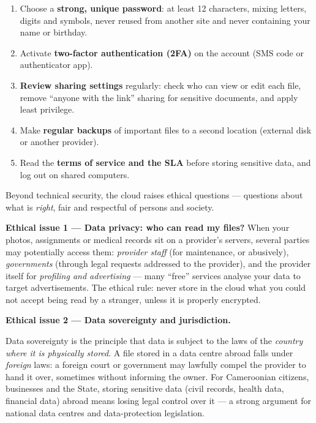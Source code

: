 \documentclass[11pt]{article}
\newcommand{\cle}[1]{{\popxbold\color{popdark}#1}}
\newcounter{popsec}
\newcounter{popsub}
\newcommand{\courssub}[1]{%
  \stepcounter{popsub}%
  \par\vspace{9pt}\noindent{\popxbold\fontsize{11.5}{13}\selectfont\color{popink}{\color{poporange}\thepopsec.\thepopsub}\hspace{6pt}#1}\par\nopagebreak\vspace{4pt}
}
\begin{document}
\begin{methode}
\begin{enumerate}
\item Choose a \textbf{strong, unique password}: at least 12 characters, mixing letters, digits and symbols, never reused from another site and never containing your name or birthday.
\item Activate \textbf{two-factor authentication (2FA)} on the account (SMS code or authenticator app).
\item \textbf{Review sharing settings} regularly: check who can view or edit each file, remove ``anyone with the link'' sharing for sensitive documents, and apply least privilege.
\item Make \textbf{regular backups} of important files to a second location (external disk or another provider).
\item Read the \textbf{terms of service and the SLA} before storing sensitive data, and log out on shared computers.
\end{enumerate}
\end{methode}

\courssub{Cloud Ethics}

Beyond technical security, the cloud raises \cle{ethical} questions — questions about what is \emph{right}, fair and respectful of persons and society.

\textbf{Ethical issue 1 — Data privacy: who can read my files?} When your photos, assignments or medical records sit on a provider's servers, several parties may potentially access them: \emph{provider staff} (for maintenance, or abusively), \emph{governments} (through legal requests addressed to the provider), and the provider itself for \emph{profiling and advertising} — many ``free'' services analyse your data to target advertisements. The ethical rule: never store in the cloud what you could not accept being read by a stranger, unless it is properly encrypted.

\textbf{Ethical issue 2 — Data sovereignty and jurisdiction.}

\begin{definition}
\cle{Data sovereignty} is the principle that data is subject to the laws of the \emph{country where it is physically stored}. A file stored in a data centre abroad falls under \emph{foreign} laws: a foreign court or government may lawfully compel the provider to hand it over, sometimes without informing the owner. For Cameroonian citizens, businesses and the State, storing sensitive data (civil records, health data, financial data) abroad means losing legal control over it — a strong argument for national data centres and data-protection legislation.
\end{definition}
\end{document}
